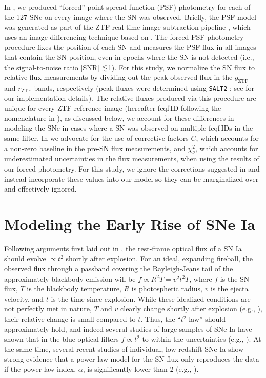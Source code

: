 \documentclass[twocolumn]{./aastex63}
\newcommand{\rztf}{$r_\mathrm{ZTF}$}
\newcommand{\gztf}{$g_\mathrm{ZTF}$}
\begin{document}
In \citet{Yao19}, we produced ``forced'' point-spread-function (PSF)
photometry for each of the 127 SNe on every image where the SN was observed.
Briefly, the PSF model was generated as part of the ZTF real-time image
subtraction pipeline \citep{Masci19}, which uses an image-differencing
technique based on \citet{Zackay16}. The forced PSF photometry procedure
fixes the position of each SN and measures the PSF flux in all images that
contain the SN position, even in epochs where the SN is not detected (i.e.,
the signal-to-noise ratio [SNR] $\lesssim$1). For this study, we normalize the SN
flux to relative flux measurements by dividing out the peak observed flux in
the \gztf- and \rztf-bands, respectively (peak fluxes were determined using
\texttt{SALT2} \citealt{Guy07}; see \citealt{Yao19} for our
implementation details). The relative fluxes produced via this procedure are
unique for every ZTF reference image (hereafter fcqf\,ID following the
nomenclature in \citealt{Yao19}), as discussed below, we account for these
differences in modeling the SNe in cases where a SN was observed on multiple
fcqf\,IDs in the same filter. In \citet{Yao19} we advocate for the use of
corrective factors $C$, which accounts for a non-zero baseline in the pre-SN
flux measurements, and $\chi^2_{\nu}$, which accounts for underestimated
uncertainties in the flux measurements, when using the results of our forced
photometry. For this study, we ignore the corrections suggested in
\citet{Yao19} and instead incorporate these values into our model so they can
be marginalized over and effectively ignored.

\section{Modeling the Early Rise of SNe Ia}\label{sec:model}

Following arguments first laid out in \citet{Riess99a}, the rest-frame optical
flux of a SN Ia should evolve $\propto t^2$ shortly after explosion. For an
ideal, expanding fireball, the observed flux through a passband covering the
Rayleigh-Jeans tail of the approximately blackbody emission will be $f \propto
R^2 T = v^2 t^2 T$, where $f$ is the SN flux, $T$ is the blackbody temperature,
$R$ is photospheric radius, $v$ is the ejecta velocity, and $t$ is the time
since explosion. While these idealized conditions are not perfectly met in
nature, $T$ and $v$ clearly change shortly after explosion (e.g.,
\citealt{Parrent12}), their relative change is small compared to $t$. Thus, the
``$t^2$-law'' should approximately hold, and indeed several studies of large
samples of SNe Ia have shown that in the blue optical filters $f \propto t^2$ to
within the uncertainties (e.g., \citealt{Conley06, Hayden10, Ganeshalingam11}).
At the same time, several recent studies of individual, low-redshift SNe Ia show
strong evidence that a power-law model for the SN flux only reproduces the data
if the power-law index, $\alpha$, is significantly lower than 2 (e.g.,
\citealt{Zheng13,Zheng14,Shappee16,Miller18,Fausnaugh19}).
\end{document}
